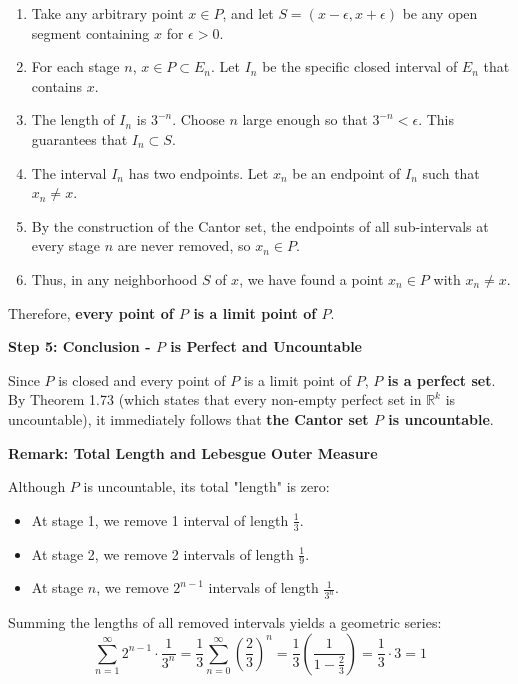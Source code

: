 \documentclass{article}
\theoremstyle{mythm}
\begin{document}
\begin{enumerate}
    \item Take any arbitrary point $x \in P$, and let $S = (x - \epsilon, x + \epsilon)$ be any open segment containing $x$ for $\epsilon > 0$.
    \item For each stage $n$, $x \in P \subset E_n$. Let $I_n$ be the specific closed interval of $E_n$ that contains $x$.
    \item The length of $I_n$ is $3^{-n}$. Choose $n$ large enough so that $3^{-n} < \epsilon$. This guarantees that $I_n \subset S$.
    \item The interval $I_n$ has two endpoints. Let $x_n$ be an endpoint of $I_n$ such that $x_n \neq x$.
    \item By the construction of the Cantor set, the endpoints of all sub-intervals at every stage $n$ are never removed, so $x_n \in P$.
    \item Thus, in any neighborhood $S$ of $x$, we have found a point $x_n \in P$ with $x_n \neq x$.
\end{enumerate}

Therefore, \textbf{every point of $P$ is a limit point of $P$}.

\textbf{Step 5: Conclusion - $P$ is Perfect and Uncountable}

Since $P$ is closed and every point of $P$ is a limit point of $P$, \textbf{$P$ is a perfect set}. 
By Theorem 1.73 (which states that every non-empty perfect set in $\mathbb{R}^k$ is uncountable), it immediately follows that \textbf{the Cantor set $P$ is uncountable}.

\textbf{Remark: Total Length and Lebesgue Outer Measure}

Although $P$ is uncountable, its total "length" is zero:
\begin{itemize}
    \item At stage 1, we remove 1 interval of length $\frac{1}{3}$.
    \item At stage 2, we remove 2 intervals of length $\frac{1}{9}$.
    \item At stage $n$, we remove $2^{n-1}$ intervals of length $\frac{1}{3^n}$.
\end{itemize}

Summing the lengths of all removed intervals yields a geometric series:
\[ \sum_{n=1}^\infty 2^{n-1} \cdot \frac{1}{3^n} = \frac{1}{3} \sum_{n=0}^\infty \left(\frac{2}{3}\right)^n = \frac{1}{3} \left( \frac{1}{1 - \frac{2}{3}} \right) = \frac{1}{3} \cdot 3 = 1 \]
\end{document}
